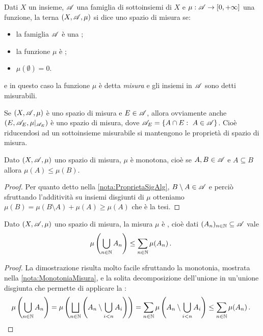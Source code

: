 \begin{definition}
	Dati $X$ un insieme, $\mathscr A$ una famiglia di sottoinsiemi di $X$ e $\mu:\mathscr A\to [0,+\infty]$ una funzione, la terna $(X,\mathscr A, \mu)$ si dice uno spazio di misura se:
	\begin{itemize}
		\item la famiglia $\mathscr A$ è una \sigalg{};
		\item la funzione $\mu$ è \sigadd{};
		\item $\mu(\emptyset)=0$.
	\end{itemize}
	e in questo caso la funzione $\mu$ è detta \emph{misura} e gli insiemi in $\mathscr A$ sono detti misurabili.
\end{definition}

\begin{remark}\label{nota:RiduzioneMisura}
	Se $(X,\mathscr A,\mu)$ è uno spazio di misura e $E\in\mathscr A$, allora ovviamente anche $(E,\mathscr A_E,\mu|_{\mathscr A_E})$ è uno spazio di misura, dove $\A_E=\{A\cap E:\ A\in\A\}$. Cioè riducendosi ad un sottoinsieme misurabile si mantengono le proprietà di spazio di misura.
\end{remark}

\begin{remark}\label{nota:MonotoniaMisura}
	Dato $(X,\mathscr A,\mu)$ uno spazio di misura, $\mu$ è monotona, cioè se $A,B\in\mathscr A$ e $A\subseteq B$ allora $\mu(A)\le \mu(B)$.
\end{remark}
\begin{proof}
	Per quanto detto nella \cref{nota:ProprietaSigAlg}, $B\setminus A\in\mathscr A$ e perciò sfruttando l'additività su insiemi disgiunti di $\mu$
	otteniamo $\mu(B)=\mu(B\setminus A)+\mu(A)\geq\mu(A)$ che è la tesi.
\end{proof}
\begin{remark}\label{nota:SubAdditivitaMisura}
	Dato $(X,\mathscr A,\mu)$ uno spazio di misura, la misura $\mu$ è \sigsubadd{}, cioè dati $(A_n)_{n\in\mathbb N}\subseteq\mathscr A$ vale
	\begin{equation*}
		\mu\left(\bigcup_{n\in\mathbb N} A_n \right)\le \sum_{n\in\mathbb N}\mu(A_n) \, \text{. }
	\end{equation*}
\end{remark}
\begin{proof}
	La dimostrazione risulta molto facile sfruttando la monotonia, mostrata nella \cref{nota:MonotoniaMisura}, e la solita decomposizione
	dell'unione in un'unione disgiunta che permette di applicare la \sigadd[ità]:
	\begin{equation*}
		\mu\left(\bigcup_{n\in\mathbb N} A_n \right)=\mu\left(\bigsqcup_{n\in\mathbb N} \left(A_n\setminus\bigcup_{i<n}A_i\right) \right)=
		\sum_{n\in\mathbb N}\mu\left(A_n\setminus\bigcup_{i<n}A_i\right)\le \sum_{n\in\mathbb N}\mu(A_n) \, \text{. }
	\end{equation*}
\end{proof}




